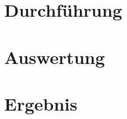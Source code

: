 \documentclass[11pt, ngerman, fleqn, DIV=15, headinclude, BCOR=2cm]{scrreprt}
\begin{document}
\chapter{Durchführung}


\chapter{Auswertung}


\chapter{Ergebnis}




\begin{appendix}


\end{appendix}
\end{document}
